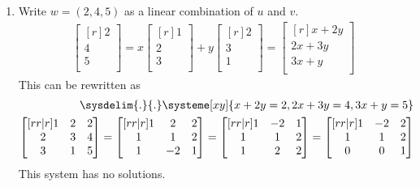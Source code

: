 \documentclass[12pt]{article}
\begin{document}
\begin{enumerate}
\begin{enumerate}
	\item Write $w=(2,4,5)$ as a linear combination of $u$ and $v$.\\
		\begin{align*}
		\begin{bmatrix}[r]2\\4\\5\\ \end{bmatrix}
		= x \begin{bmatrix}[r] 1\\2\\3\\ \end{bmatrix}
		+ y \begin{bmatrix}[r] 2\\3\\1\\ \end{bmatrix}
		= \begin{bmatrix}[r] x+2y\\ 2x+3y\\ 3x+y\\ \end{bmatrix}
		\end{align*}
		This can be rewritten as
		\begin{align*}
		\sysdelim{.}{.}\systeme[xy]{x+2y=2,2x+3y=4,3x+y=5}\\
		\begin{bmatrix}[rr|r] 1&2&2\\2&3&4\\3&1&5\\ \end{bmatrix}
		= \begin{bmatrix}[rr|r] 1&2&2\\1&1&2\\1&-2&1\\ \end{bmatrix}
		= \begin{bmatrix}[rr|r] 1&-2&1\\1&1&2\\1&2&2\\ \end{bmatrix}
		= \begin{bmatrix}[rr|r] 1&-2&2\\1&1&2\\0&0&1\\ \end{bmatrix}
		\end{align*}
		This system has no solutions.\\


\end{enumerate}
\end{enumerate}
\end{document}
